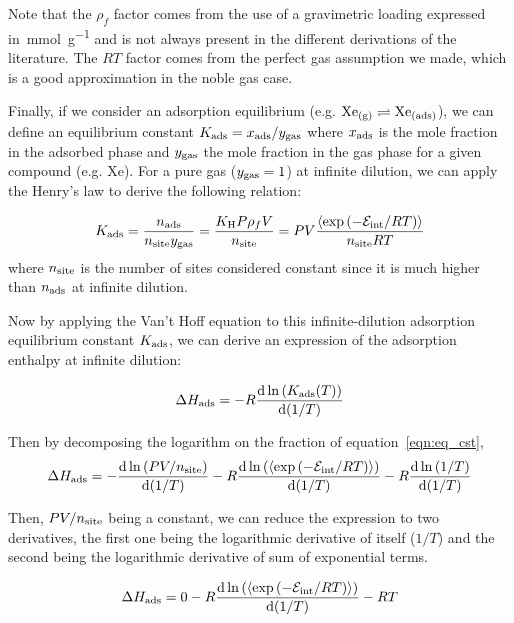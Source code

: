 \documentclass[main.tex]{subfiles}
\begin{document}
Note that the $\rho_f$ factor comes from the use of a gravimetric loading expressed in~\si{\milli\mole\per\gram} and is not always present in the different derivations of the literature.\cite{PoreBlazer} The $RT$ factor comes from the perfect gas assumption we made, which is a good approximation in the noble gas case. 

Finally, if we consider an adsorption equilibrium (e.g. $\text{Xe}_{\text{(g)}} \rightleftharpoons \text{Xe}_{\text{(ads)}}$), we can define an equilibrium constant $K_{\text{ads}} = x_{\text{ads}}/y_{\text{gas}}$ where $x_{\text{ads}}$ is the mole fraction in the adsorbed phase and $y_{\text{gas}}$ the mole fraction in the gas phase for a given compound (e.g. Xe). For a pure gas ($y_{\text{gas}}=1$) at infinite dilution, we can apply the Henry's law to derive the following relation:

\begin{equation}\label{eqn:eq_cst}
  K_{\text{ads}} = \dfrac{n_{\text{ads}}}{n_{\text{site}}y_{\text{gas}}} = \dfrac{K_{\text{H}}P\rho_fV}{n_{\text{site}}} = PV \dfrac{\langle \exp\left(-\mathcal{E}_{\text{int}}/RT\right) \rangle}{n_{\text{site}}RT}
\end{equation}
where $n_{\text{site}}$ is the number of sites considered constant since it is much higher than $n_{\text{ads}}$ at infinite dilution.

Now by applying the Van't Hoff equation to this infinite-dilution adsorption equilibrium constant $K_{\text{ads}}$, we can derive an expression of the adsorption enthalpy at infinite dilution:

\begin{equation}
  \Delta H_{\text{ads}} = -R\dfrac{\mathop{}\mathopen{}\mathrm{d} \ln\left(K_{\text{ads}}(T)\right)}{\mathop{}\mathopen{}\mathrm{d} (1/T)}
\end{equation}

Then by decomposing the logarithm on the fraction of equation~\ref{eqn:eq_cst}, 
\begin{equation}
  \Delta H_{\text{ads}} = -\dfrac{\mathop{}\mathopen{}\mathrm{d} \ln\left(PV/n_{\text{site}}\right)}{\mathop{}\mathopen{}\mathrm{d} (1/T)} - R\dfrac{\mathop{}\mathopen{}\mathrm{d} \ln\left(\langle \exp\left(-\mathcal{E}_{\text{int}}/RT\right) \rangle\right)}{\mathop{}\mathopen{}\mathrm{d} (1/T)} - R\dfrac{\mathop{}\mathopen{}\mathrm{d} \ln\left(1/T\right)}{\mathop{}\mathopen{}\mathrm{d} (1/T)}
\end{equation}

Then, $PV/n_{\text{site}}$ being a constant, we can reduce the expression to two derivatives, the first one being the logarithmic derivative of itself ($1/T$) and the second being the logarithmic derivative of sum of exponential terms. 

\begin{equation}
  \Delta H_{\text{ads}} = 0 - R\dfrac{\mathop{}\mathopen{}\mathrm{d} \ln\left(\langle \exp\left(-\mathcal{E}_{\text{int}}/RT\right) \rangle\right)}{\mathop{}\mathopen{}\mathrm{d} (1/T)} - RT
\end{equation}
\end{document}
